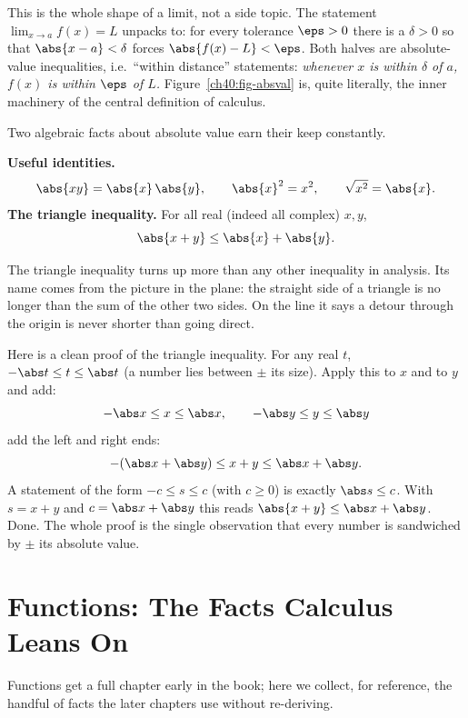\begin{connectionbox}
This is the whole shape of a limit, not a side topic. The statement
$\lim_{x\to a} f(x) = L$ unpacks to: for every tolerance $\eps>0$ there is a
$\delta>0$ so that $\abs{x-a}<\delta$ forces $\abs{f(x)-L}<\eps$. Both halves are
absolute-value inequalities, i.e.\ ``within distance'' statements: \emph{whenever
$x$ is within $\delta$ of $a$, $f(x)$ is within $\eps$ of $L$.}
Figure~\ref{ch40:fig-absval} is, quite literally, the inner machinery of the
central definition of calculus.
\end{connectionbox}

Two algebraic facts about absolute value earn their keep constantly.

\begin{focusbox}
\textbf{Useful identities.}
\[
  \abs{xy} = \abs{x}\,\abs{y}, \qquad \abs{x}^2 = x^2, \qquad \sqrt{x^2}=\abs{x}.
\]
\textbf{The triangle inequality.} For all real (indeed all complex) $x,y$,
\[
  \abs{x+y} \le \abs{x} + \abs{y}.
\]
\end{focusbox}

The triangle inequality turns up more than any other inequality in analysis.
Its name comes from the picture in the plane: the straight side of a triangle is no
longer than the sum of the other two sides. On the line it says a detour through
the origin is never shorter than going direct.

\begin{whybox}
Here is a clean proof of the triangle inequality. For any real $t$, $-\abs t \le t
\le \abs t$ (a number lies between $\pm$ its size). Apply this to $x$ and to $y$
and add:
\[
  -\abs x \le x \le \abs x, \qquad -\abs y \le y \le \abs y
\]
add the left and right ends:
\[
  -(\abs x + \abs y) \le x + y \le \abs x + \abs y.
\]
A statement of the form $-c \le s \le c$ (with $c \ge 0$) is exactly
$\abs s \le c$. With $s = x+y$ and $c = \abs x + \abs y$ this reads
$\abs{x+y} \le \abs x + \abs y$. Done. The whole proof is the single observation
that every number is sandwiched by $\pm$ its absolute value.
\end{whybox}

\section{Functions: The Facts Calculus Leans On}
\label{ch40:functions}

Functions get a full chapter early in the book; here we collect, for reference, the
handful of facts the later chapters use without re-deriving.

